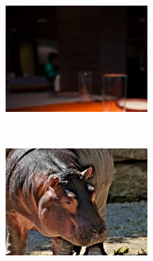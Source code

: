 \begin{figure}[htb]
    \centering
    \caption{Samples from the KonIQ database: blurred image (a) and sharp image (b).}
    \label{fig:koniq_example}
    \begin{subfigure}[t]{0.45\textwidth}
        \centering
        \includegraphics[height=4cm]{images/koniq-blurred.jpg}
        \caption{}
    \end{subfigure}%
    ~ 
    \begin{subfigure}[t]{0.45\textwidth}
        \centering
        \includegraphics[height=4cm]{images/koniq-sharp.jpg}
        \caption{}
    \end{subfigure}
    \centering
\end{figure}